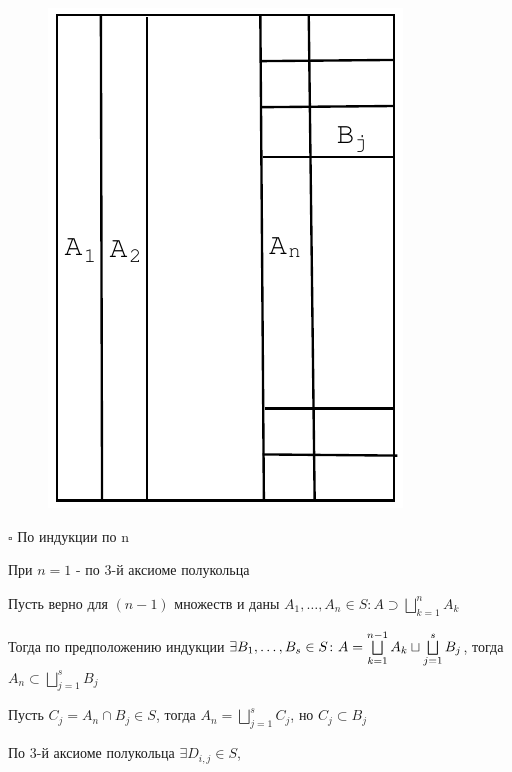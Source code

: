 \documentclass[a4paper]{report}
\newcommand*{\hm}[1]{#1\nobreak\discretionary{}%
            {\hbox{$\mathsurround=0pt #1$}}{}}
\begin{document}
\begin{figure} 
\includegraphics[width=\linewidth]{3}
\end{figure}

\noindent $\square$ По индукции по n

При $n=1$ - по 3-й аксиоме полукольца

Пусть верно для $(n-1)$ множеств и даны $A_1,\ldots,A_n\in S\colon A\supset\bigsqcup\limits_{k=1}^n A_k$

\noindent Тогда по предположению индукции $\exists B_1,\ldots,B_s\hm\in S\colon A=\bigsqcup\limits_{k=1}^{n-1}A_k\sqcup\bigsqcup\limits
_{j=1}^s B_j$, тогда $A_n\subset\bigsqcup\limits_{j=1}^s B_j$

Пусть $C_j=A_n\cap B_j\in S$, тогда $A_n=\bigsqcup\limits_{j=1}^s C_j$, но $C_j\subset B_j$

По 3-й аксиоме полукольца $\exists D_{i,j}\in S$,
\end{document}

